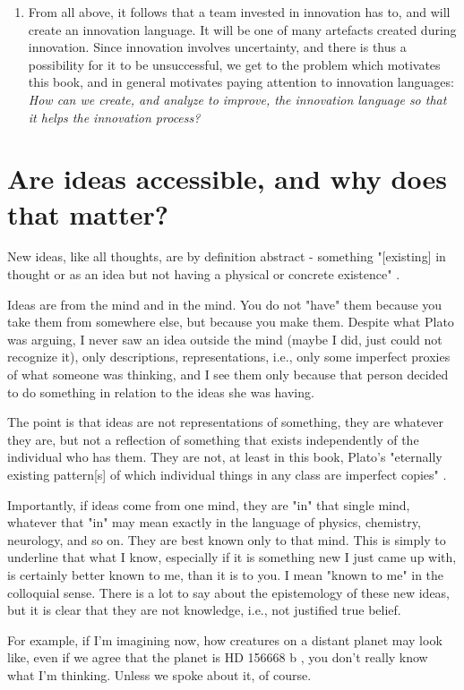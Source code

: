\begin{enumerate}
	\item From all above, it follows that a team invested in innovation has to, and will create an innovation language. It will be one of many artefacts created during innovation. Since innovation involves uncertainty, and there is thus a possibility for it to be unsuccessful, we get to the problem which motivates this book, and in general motivates paying attention to innovation languages: \textit{How can we create, and analyze to improve, the innovation language so that it helps the innovation process?}
\end{enumerate}

\section{Are ideas accessible, and why does that matter?}
\label{c1-s6}
New ideas, like all thoughts, are by definition abstract - something "[existing] in thought or as an idea but not having a physical or concrete existence" \cite{def-abstract}.

Ideas are from the mind and in the mind. You do not "have" them because you take them from somewhere else, but because you make them. Despite what Plato was arguing, I never saw an idea outside the mind (maybe I did, just could not recognize it), only descriptions, representations, i.e., only some imperfect proxies of what someone was thinking, and I see them only because that person decided to do something in relation to the ideas she was having.

The point is that ideas are not representations of something, they are whatever they are, but not a reflection of something that exists independently of the individual who has them. They are not, at least in this book, Plato's "eternally existing pattern[s] of which individual things in any class are imperfect copies" \cite{def-idea,Kraut2017}. 

Importantly, if ideas come from one mind, they are "in" that single mind, whatever that "in" may mean exactly in the language of physics, chemistry, neurology, and so on. They are best known only to that mind. This is simply to underline that what I know, especially if it is something new I just came up with, is certainly better known to me, than it is to you. I mean "known to me" in the colloquial sense. There is a lot to say about the epistemology of these new ideas, but it is clear that they are not knowledge, i.e., not justified true belief.

For example, if I'm imagining now, how creatures on a distant planet may look like, even if we agree that the planet is HD 156668 b \cite{wikipedia-hd156668b}, you don't really know what I'm thinking. Unless we spoke about it, of course.


